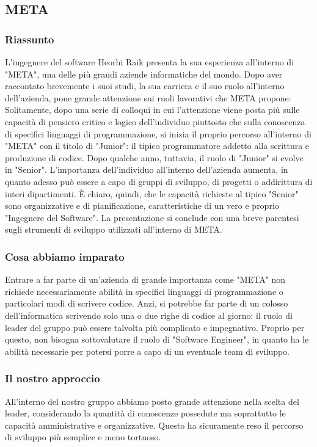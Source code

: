 \documentclass{report}
\begin{document}
\subsection{META}
\subsubsection*{Riassunto}
L'ingegnere del software Heorhi Raik presenta la sua esperienza all'interno di "META", una delle più grandi aziende informatiche del mondo. Dopo aver raccontato brevemente i suoi studi, la sua carriera e il suo ruolo all'interno dell'azienda, pone grande attenzione sui ruoli lavorativi che META propone:
Solitamente, dopo una serie di colloqui in cui l'attenzione viene posta più sulle capacità di pensiero critico e logico dell'individuo piuttosto che sulla conoscenza di specifici linguaggi di programmazione, si inizia il proprio percorso all'interno di "META" con il titolo di "Junior": il tipico programmatore addetto alla scrittura e produzione di codice. Dopo qualche anno, tuttavia, il ruolo di "Junior" si evolve in "Senior". L'importanza dell'individuo all'interno dell'azienda aumenta, in quanto adesso può essere a capo di gruppi di sviluppo, di progetti o addirittura di interi dipartimenti. È chiaro, quindi, che le capacità richieste al tipico "Senior" sono organizzative e di pianificazione, caratteristiche di un vero e proprio "Ingegnere del Software".
La presentazione si conclude con una breve parentesi sugli strumenti di sviluppo utilizzati all'interno di META.

\subsubsection*{Cosa abbiamo imparato}
Entrare a far parte di un'azienda di grande importanza come "META" non richiede necessariamente abilità in specifici linguaggi di programmazione o particolari modi di scrivere codice. Anzi, si potrebbe far parte di un colosso dell'informatica scrivendo solo una o due righe di codice al giorno: il ruolo di leader del gruppo può essere talvolta più complicato e impegnativo. Proprio per questo, non bisogna sottovalutare il ruolo di "Software Engineer", in quanto ha le abilità necessarie per potersi porre a capo di un eventuale team di sviluppo.

\subsubsection*{Il nostro approccio}
All'interno del nostro gruppo abbiamo posto grande attenzione nella scelta del leader, considerando la quantità di conoscenze possedute ma soprattutto le capacità amministrative e organizzative. Questo ha sicuramente reso il percorso di sviluppo più semplice e meno tortuoso.
\end{document}
